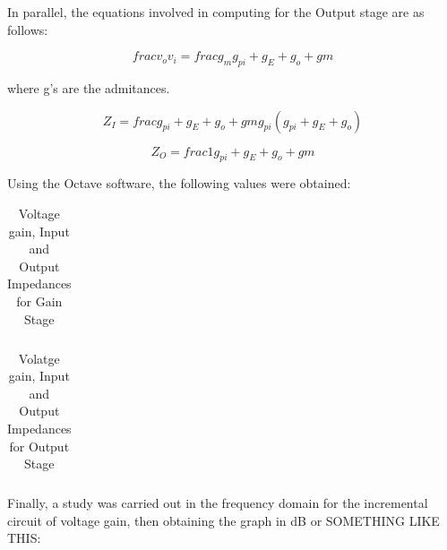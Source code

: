 \par In parallel, the equations involved in computing for the Output stage are as follows:

\begin{equation}
  
frac{v_{o}}{v_{i}}=frac{g_m}{g_{pi}+g_{E}+g_{o}+g{m}}
  \label{}
\end{equation}

where g's are the admitances. 

\begin{equation}
  
Z_{I}=frac{g_{pi}+g_{E}+g_{o}+g{m}}{g_{pi}(g_{pi}+g_{E}+g_{o})}
  \label{}
\end{equation}

\begin{equation}
  
Z_{O}=frac{1}{g_{pi}+g_{E}+g_{o}+g{m}}
  \label{}
\end{equation}



Using the Octave software, the following values ​​were obtained:

\FloatBarrier
\begin{table}[h]
  \centering
  \begin{tabular}{|c|c|}
    \hline    
    
    \hline
  \end{tabular}
  \caption{Voltage gain, Input and Output Impedances for Gain Stage}
  \label{tab:Octave}
\end{table}
\FloatBarrier    

\FloatBarrier
\begin{table}[h]
  \centering
  \begin{tabular}{|c|c|}
    \hline    
    
    \hline
  \end{tabular}
  \caption{Volatge gain, Input and Output Impedances for Output Stage}
  \label{tab:Octave}
\end{table}
\FloatBarrier     


Finally, a study was carried out in the frequency domain for the incremental circuit of voltage gain, then obtaining the graph in dB or SOMETHING LIKE THIS: 


